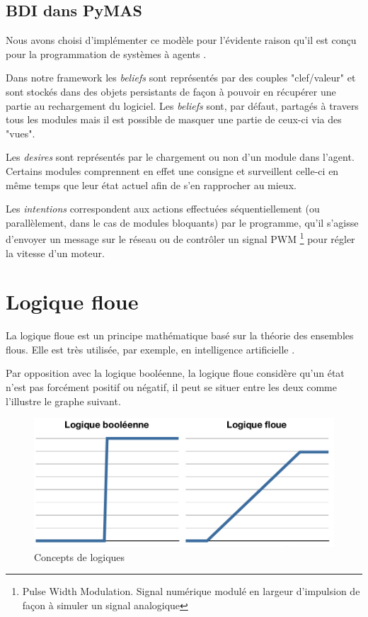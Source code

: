 \documentclass[11pt]{book}
\begin{document}
\subsection{BDI dans PyMAS}
Nous avons choisi d’implémenter ce modèle pour l'évidente raison qu'il est 
conçu pour la programmation de systèmes à agents 
\cite{jennings1993specification}. 

Dans notre framework les \textit{beliefs} sont représentés par des couples 
"clef/valeur" et sont stockés dans des objets persistants de façon à 
pouvoir en récupérer une partie au rechargement du logiciel. Les 
\textit{beliefs} sont, par défaut, partagés à travers tous les modules mais 
il est possible de masquer une partie de ceux-ci via des "vues".

Les \textit{desires} sont représentés par le chargement ou non d'un module 
dans l'agent. Certains modules comprennent en effet une consigne et 
surveillent celle-ci en même temps que leur état actuel afin de s'en 
rapprocher au mieux.

Les \textit{intentions} correspondent aux actions effectuées 
séquentiellement (ou parallèlement, dans le cas de modules bloquants) par 
le programme, qu'il s'agisse d'envoyer un message sur le réseau ou de 
contrôler un signal PWM \footnote{Pulse Width Modulation. Signal numérique 
modulé en largeur d'impulsion de façon à simuler un signal analogique} pour 
régler la vitesse d'un moteur.

\section{Logique floue}
La logique floue est un principe mathématique basé sur la théorie des 
ensembles flous. Elle est très utilisée, par exemple, en intelligence 
artificielle \cite{wang1994adaptive}.

Par opposition avec la logique booléenne, la logique floue considère qu'un 
état n'est pas forcément positif ou négatif, il peut se situer entre les 
deux comme l'illustre le graphe suivant.

\begin{figure}[h]
  \begin{center}
    \includegraphics[width=13cm]{imgs/fuzzy_logic.png}
    \caption{Concepts de logiques}
  \end{center}
\end{figure}
\end{document}
